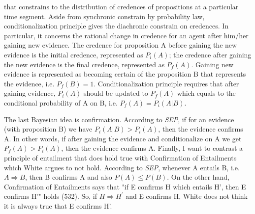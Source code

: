 that constrains to the distribution of credences of propositions at a
particular time segment. Aside from synchronic constrain by probability
law, conditionalization principle gives the diachronic constrain on
credences. In particular, it concerns the rational change in credence
for an agent after him/her gaining new evidence. The credence for
proposition A before gaining the new evidence is the initial credence,
represented as \(P_{i}(A)\); the credence after gaining the new evidence
is the final credence, represented as \(P_{f}(A)\). Gaining new evidence
is represented as becoming certain of the proposition B that represents
the evidence, i.e. \(P_{f}(B) = 1\). Conditionalization principle
requires that after gaining evidence, \(P_{i}(A)\) should be updated to
\(P_{f}(A)\) which equals to the conditional probability of A on B, i.e.
\(P_{f}(A) = P_{i}(A|B)\).

The last Bayesian idea is confirmation. According to \emph{SEP}, if for
an evidence (with proposition B) we have \(P_{i}(A|B) > P_{i}(A)\), then
the evidence confirms A. In other words, if after gaining the evidence
and conditionalize on A we get \(P_{f}(A) > P_{i}(A)\), then the
evidence confirms A. Finally, I want to contrast a principle of
entailment that does hold true with Confirmation of Entailments which
White argues to not hold. According to \emph{SEP}, whenever A entails B,
i.e. \(A \Rightarrow B\), then B confirms A and also \(P(A) \leq P(B)\).
On the other hand, Confirmation of Entailments says that "if E confirms
H which entails H', then E confirms H'" holds (532). So, if
\(H \Rightarrow H^{'}\) and E confirms H, White does not think it is
always true that E confirms H'.

